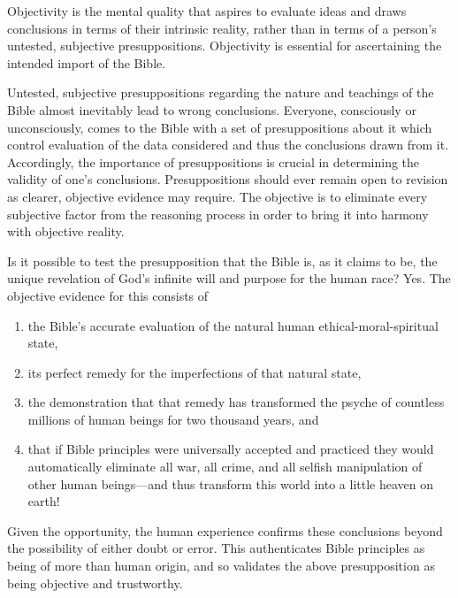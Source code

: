 Objectivity is the mental quality that aspires to evaluate ideas and draws
conclusions in terms of their intrinsic reality, rather than in terms of a
person's untested, subjective presuppositions. Objectivity is essential for
ascertaining the intended import of the Bible.

Untested, subjective presuppositions regarding the nature and teachings of
the Bible almost inevitably lead to wrong conclusions. Everyone, consciously
or unconsciously, comes to the Bible with a set of presuppositions about it
which control evaluation of the data considered and thus the conclusions
drawn from it. Accordingly, the importance of presuppositions is crucial in
determining the validity of one's conclusions. Presuppositions should ever
remain open to revision as clearer, objective evidence may require. The
objective is to eliminate every subjective factor from the reasoning process
in order to bring it into harmony with objective reality.

Is it possible to test the presupposition that the Bible is, as it claims to
be, the unique revelation of God's infinite will and purpose for the human
race? Yes. The objective evidence for this consists of 
\begin{enumerate}
    \item the Bible's
accurate evaluation of the natural human ethical-moral-spiritual state, 
    \item its perfect remedy for the imperfections of that natural state,
    \item the
demonstration that that remedy has transformed the psyche of countless
millions of human beings for two thousand years, and
    \item that if Bible
principles were universally accepted and practiced they would automatically
eliminate all war, all crime, and all selfish manipulation of other human
beings---and thus transform this world into a little heaven on earth!
\end{enumerate}
Given
the opportunity, the human experience confirms these conclusions beyond the
possibility of either doubt or error. This authenticates Bible principles as
being of more than human origin, and so validates the above presupposition
as being objective and trustworthy.

